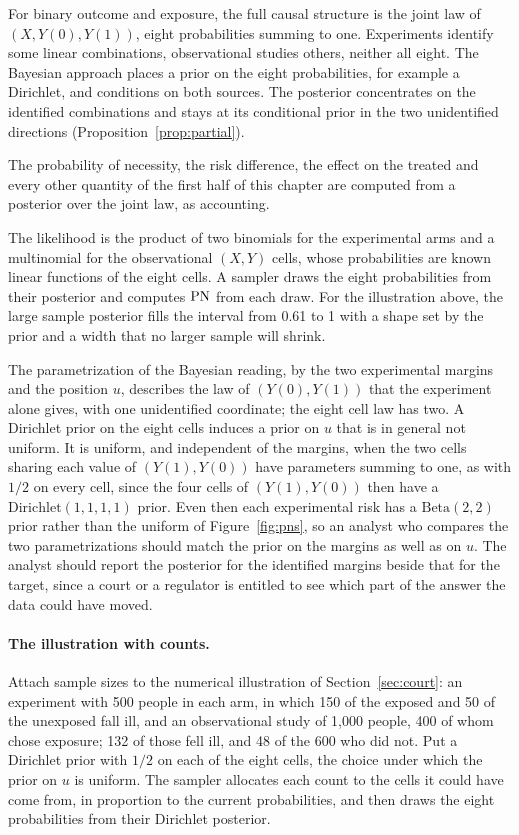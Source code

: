 For binary outcome and exposure, the full causal structure is the joint law of $(X, Y(0), Y(1))$, eight probabilities summing to one. Experiments identify some linear combinations, observational studies others, neither all eight. The Bayesian approach places a prior on the eight probabilities, for example a Dirichlet, and conditions on both sources. The posterior concentrates on the identified combinations and stays at its conditional prior in the two unidentified directions (Proposition~\ref{prop:partial}).

The probability of necessity, the risk difference, the effect on the treated and every other quantity of the first half of this chapter are computed from a posterior over the joint law, as accounting. 

The likelihood is the product of two binomials for the experimental arms and a multinomial for the observational $(X, Y)$ cells, whose probabilities are known linear functions of the eight cells. A sampler draws the eight probabilities from their posterior and computes $\mathrm{PN}$ from each draw. For the illustration above, the large sample posterior fills the interval from 0.61 to 1 with a shape set by the prior and a width that no larger sample will shrink.

The parametrization of the Bayesian reading, by the two experimental margins and the position $u$, describes the law of $(Y(0), Y(1))$ that the experiment alone gives, with one unidentified coordinate; the eight cell law has two. A Dirichlet prior on the eight cells induces a prior on $u$ that is in general not uniform. It is uniform, and independent of the margins, when the two cells sharing each value of $(Y(1), Y(0))$ have parameters summing to one, as with $1/2$ on every cell, since the four cells of $(Y(1), Y(0))$ then have a $\mathrm{Dirichlet}(1, 1, 1, 1)$ prior. Even then each experimental risk has a $\mathrm{Beta}(2, 2)$ prior rather than the uniform of Figure~\ref{fig:pns}, so an analyst who compares the two parametrizations should match the prior on the margins as well as on $u$. The analyst should report the posterior for the identified margins beside that for the target, since a court or a regulator is entitled to see which part of the answer the data could have moved.

\paragraph{The illustration with counts.} Attach sample sizes to the numerical illustration of Section~\ref{sec:court}: an experiment with 500 people in each arm, in which 150 of the exposed and 50 of the unexposed fall ill, and an observational study of 1,000 people, 400 of whom chose exposure; 132 of those fell ill, and 48 of the 600 who did not. Put a Dirichlet prior with $1/2$ on each of the eight cells, the choice under which the prior on $u$ is uniform. The sampler allocates each count to the cells it could have come from, in proportion to the current probabilities, and then draws the eight probabilities from their Dirichlet posterior.

